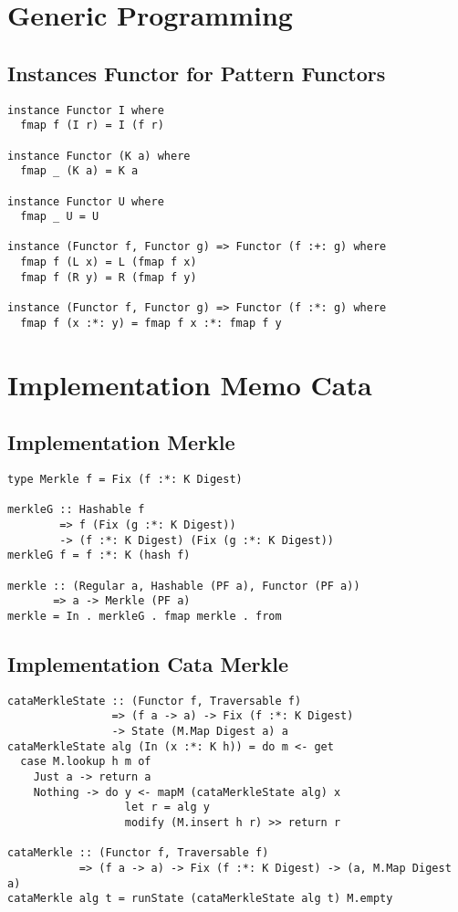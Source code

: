 \appendix
\chapter{Generic Programming}
\section{Instances Functor for Pattern Functors}
\label{app-inst-functor-patfun}
\begin{verbatim}
instance Functor I where
  fmap f (I r) = I (f r)

instance Functor (K a) where
  fmap _ (K a) = K a

instance Functor U where
  fmap _ U = U

instance (Functor f, Functor g) => Functor (f :+: g) where
  fmap f (L x) = L (fmap f x)
  fmap f (R y) = R (fmap f y)

instance (Functor f, Functor g) => Functor (f :*: g) where
  fmap f (x :*: y) = fmap f x :*: fmap f y
\end{verbatim}


\chapter{Implementation Memo Cata}
\section{Implementation Merkle}
\label{app-impl-merkle}
\begin{verbatim}
type Merkle f = Fix (f :*: K Digest)

merkleG :: Hashable f 
        => f (Fix (g :*: K Digest)) 
        -> (f :*: K Digest) (Fix (g :*: K Digest))
merkleG f = f :*: K (hash f)

merkle :: (Regular a, Hashable (PF a), Functor (PF a)) 
       => a -> Merkle (PF a)
merkle = In . merkleG . fmap merkle . from
\end{verbatim}

\section{Implementation Cata Merkle}
\label{app-impl-cata-merkle}
\begin{verbatim}
cataMerkleState :: (Functor f, Traversable f)
                => (f a -> a) -> Fix (f :*: K Digest) 
                -> State (M.Map Digest a) a
cataMerkleState alg (In (x :*: K h)) = do m <- get
  case M.lookup h m of
    Just a -> return a
    Nothing -> do y <- mapM (cataMerkleState alg) x
                  let r = alg y
                  modify (M.insert h r) >> return r

cataMerkle :: (Functor f, Traversable f)
           => (f a -> a) -> Fix (f :*: K Digest) -> (a, M.Map Digest a)
cataMerkle alg t = runState (cataMerkleState alg t) M.empty
\end{verbatim}

